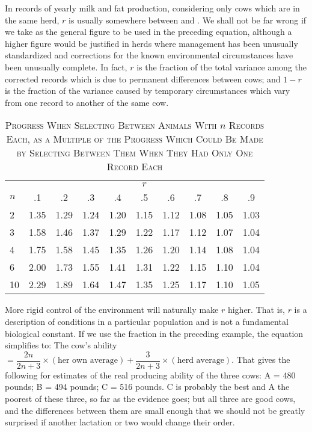 In records of yearly milk and fat production, considering only cows
which are in the same herd, $r$ is usually somewhere between  and
. We shall not be far wrong if we take  as the general figure to be
used in the preceding equation, although a higher figure would be justified
in herds where management has been unusually standardized and
corrections for the known environmental circumstances have been
unusually complete. In fact, $r$ is the fraction of the total variance among
the corrected records which is due to permanent differences between
cows; and $1 - r$ is the fraction of the variance caused by temporary circumstances
which vary from one record to another of the same cow.

\begin{table}[t]
	\centering
	\caption{\textsc{Progress When Selecting Between Animals With} $n$ 
	\textsc{Records Each, as a Multiple of the Progress Which Could Be Made by
	Selecting Between Them When They Had Only One Record Each}}
	\label{tbl:Lush_Table_13}
	\begin{tabular}{l|c|c|c|c|c|c|c|c|c}
		\hline
		\hline
		 		& \multicolumn{9}{c}{$r$} \\
		 \cline{2-10}
		 $n$	& .1	& .2	& .3	& .4	& .5	& .6	& .7	& .8	& .9 \\
		 \hline
		 2		& 1.35	& 1.29	& 1.24 	& 1.20 	& 1.15	& 1.12	& 1.08	& 1.05 	& 1.03 \\
		 3		& 1.58	& 1.46	& 1.37	& 1.29	& 1.22	& 1.17	& 1.12	& 1.07 	& 1.04 \\
		 4		& 1.75	& 1.58	& 1.45	& 1.35	& 1.26	& 1.20	& 1.14	& 1.08 	& 1.04 \\
		 6		& 2.00	& 1.73	& 1.55	& 1.41	& 1.31	& 1.22	& 1.15	& 1.10 	& 1.04 \\
		 10		& 2.29	& 1.89	& 1.64	& 1.47	& 1.35	& 1.25	& 1.17	& 1.10 	& 1.05 \\
		 \hline
	\end{tabular}
\end{table}

\noindent
More rigid control of the environment will naturally make $r$ higher.
That is, $r$ is a description of conditions in a particular population and
is not a fundamental biological constant. If we use the fraction  in
the preceding example, the equation simplifies to: The cow's ability
\(= \dfrac{2n}{2n + 3} \times (\textrm{her own average}) + \dfrac{3}{2n + 3}
\times (\textrm{herd average})\).
That gives the following for estimates of the real producing ability of the three
cows: A = 480 pounds; B = 494 pounds; C = 516 pounds. C is probably
the best and A the poorest of these three, so far as the evidence
goes; but all three are good cows, and the differences between them are
small enough that we should not be greatly surprised if another lactation
or two would change their order.

